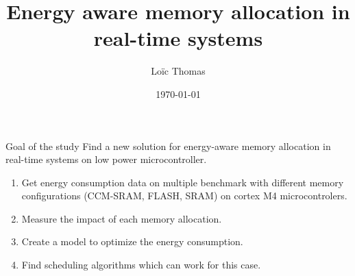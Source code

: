 \documentclass[
	11pt, %
]{beamer}
\title[]{Energy aware memory allocation in real-time systems} %
\subtitle{} %
\author[]{Loïc Thomas} %
\institute[]{LAAS CNRS \\ \smallskip  \textit{l\_thomas@insa-toulouse.fr}} %
\date[\today]{\today} %
\begin{document}

\begin{frame}
	\titlepage %
\end{frame}




\begin{frame}{Goal of the study}
	Find a new solution for energy-aware memory allocation in real-time systems on low power microcontroller.
	\begin{enumerate}
		\item Get energy consumption data on multiple benchmark with different memory configurations (CCM-SRAM, FLASH, SRAM) on cortex M4 microcontrolers.
		\item Measure the impact of each memory allocation.
		\item Create a model to optimize the energy consumption.
		\item Find scheduling algorithms which can work for this case.
	\end{enumerate}
\end{frame}
\end{document}
